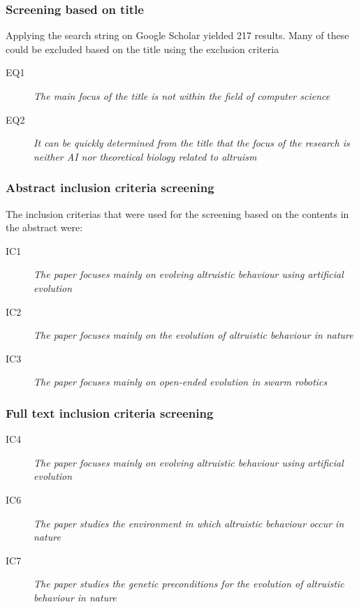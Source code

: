 \documentclass[a4paper]{book}
\begin{document}
\subsubsection{Screening based on title}
Applying the search string on Google Scholar yielded 217 results. Many of these could be excluded based on the title using the exclusion criteria

\begin{description}
\item[EQ1] {\it The main focus of the title is not within the field of computer science}
\item[EQ2] {\it It can be quickly determined from the title that the focus of the research is neither AI nor theoretical biology related to altruism}
\end{description}


\subsubsection{Abstract inclusion criteria screening}

The inclusion criterias that were used for the screening based on the contents in the abstract were:

\begin{description}
\item[IC1] {\it The paper focuses mainly on evolving altruistic behaviour using artificial evolution}
\item[IC2] {\it The paper focuses mainly on the evolution of altruistic behaviour in nature}
\item[IC3] {\it The paper focuses mainly on open-ended evolution in swarm robotics}
\end{description}

\subsubsection{Full text inclusion criteria screening}

\begin{description}
\item[IC4] {\it The paper focuses mainly on evolving altruistic behaviour using artificial evolution}
\item[IC6] {\it The paper studies the environment in which altruistic behaviour occur in nature}
\item[IC7] {\it The paper studies the genetic preconditions for the evolution of altruistic behaviour in nature}
\end{description}
\end{document}
